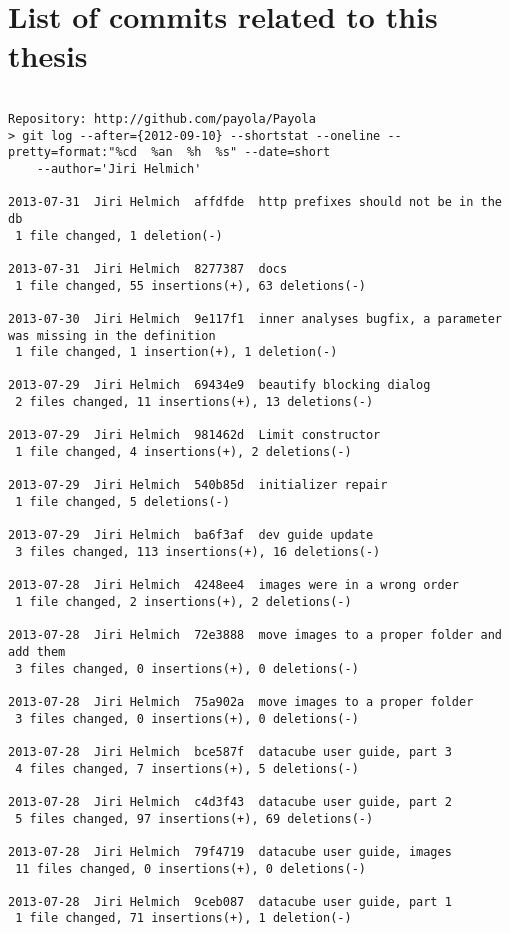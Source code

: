 \chapter{List of commits related to this thesis}
{\scriptsize
\begin{verbatim}

Repository: http://github.com/payola/Payola
> git log --after={2012-09-10} --shortstat --oneline --pretty=format:"%cd  %an  %h  %s" --date=short
    --author='Jiri Helmich'
    
2013-07-31  Jiri Helmich  affdfde  http prefixes should not be in the db
 1 file changed, 1 deletion(-)

2013-07-31  Jiri Helmich  8277387  docs
 1 file changed, 55 insertions(+), 63 deletions(-)

2013-07-30  Jiri Helmich  9e117f1  inner analyses bugfix, a parameter was missing in the definition
 1 file changed, 1 insertion(+), 1 deletion(-)

2013-07-29  Jiri Helmich  69434e9  beautify blocking dialog
 2 files changed, 11 insertions(+), 13 deletions(-)

2013-07-29  Jiri Helmich  981462d  Limit constructor
 1 file changed, 4 insertions(+), 2 deletions(-)

2013-07-29  Jiri Helmich  540b85d  initializer repair
 1 file changed, 5 deletions(-)

2013-07-29  Jiri Helmich  ba6f3af  dev guide update
 3 files changed, 113 insertions(+), 16 deletions(-)

2013-07-28  Jiri Helmich  4248ee4  images were in a wrong order
 1 file changed, 2 insertions(+), 2 deletions(-)

2013-07-28  Jiri Helmich  72e3888  move images to a proper folder and add them
 3 files changed, 0 insertions(+), 0 deletions(-)

2013-07-28  Jiri Helmich  75a902a  move images to a proper folder
 3 files changed, 0 insertions(+), 0 deletions(-)

2013-07-28  Jiri Helmich  bce587f  datacube user guide, part 3
 4 files changed, 7 insertions(+), 5 deletions(-)

2013-07-28  Jiri Helmich  c4d3f43  datacube user guide, part 2
 5 files changed, 97 insertions(+), 69 deletions(-)

2013-07-28  Jiri Helmich  79f4719  datacube user guide, images
 11 files changed, 0 insertions(+), 0 deletions(-)

2013-07-28  Jiri Helmich  9ceb087  datacube user guide, part 1
 1 file changed, 71 insertions(+), 1 deletion(-)


\end{verbatim}}
